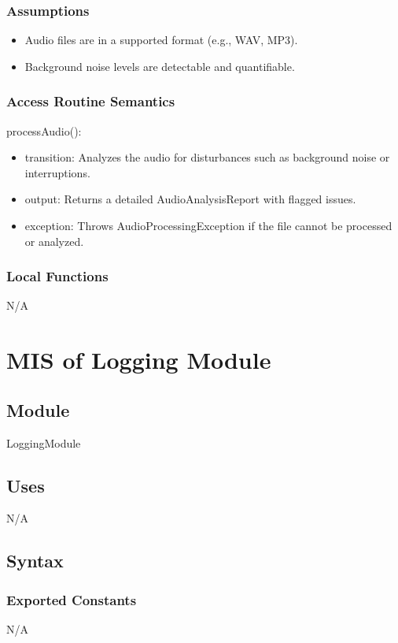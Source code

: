 \documentclass[12pt, titlepage]{article}
\begin{document}
\subsubsection{Assumptions}
\begin{itemize}
\item Audio files are in a supported format (e.g., WAV, MP3).
\item Background noise levels are detectable and quantifiable.
\end{itemize}

\subsubsection{Access Routine Semantics}

\noindent processAudio():
\begin{itemize}
\item transition: Analyzes the audio for disturbances such as background noise or interruptions.
\item output: Returns a detailed AudioAnalysisReport with flagged issues.
\item exception: Throws AudioProcessingException if the file cannot be processed or analyzed.
\end{itemize}

\subsubsection{Local Functions}
N/A

\section{MIS of Logging Module} \label{LoggingModule}

\subsection{Module}
LoggingModule

\subsection{Uses}
N/A

\subsection{Syntax}

\subsubsection{Exported Constants}
N/A
\end{document}
